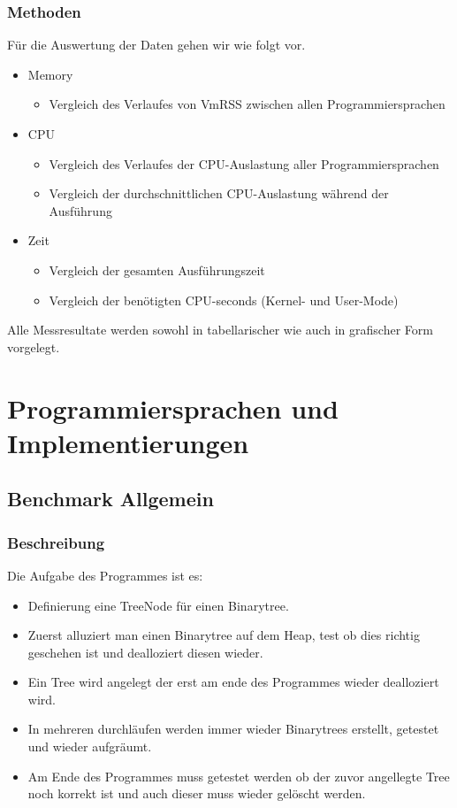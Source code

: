 \documentclass{fancydocument}
\begin{document}
\subsubsection{Methoden}
Für die Auswertung der Daten gehen wir wie folgt vor.
\begin{itemize}
\item Memory
\begin{itemize}
\item Vergleich des Verlaufes von VmRSS zwischen allen Programmiersprachen
\end{itemize}
\item CPU
\begin{itemize}
\item Vergleich des Verlaufes der CPU-Auslastung aller Programmiersprachen
\item Vergleich der durchschnittlichen CPU-Auslastung während der Ausführung
\end{itemize}
\item Zeit
\begin{itemize}
\item Vergleich der gesamten Ausführungszeit
\item Vergleich der benötigten CPU-seconds (Kernel- und User-Mode)
\end{itemize}
\end{itemize}
Alle Messresultate werden sowohl in tabellarischer wie auch in grafischer Form vorgelegt.
\section{Programmiersprachen und Implementierungen}

\subsection{Benchmark Allgemein}

\subsubsection{Beschreibung}

Die Aufgabe des Programmes ist es:
\begin{itemize}
\item Definierung eine TreeNode f\"ur einen Binarytree.
\item Zuerst alluziert man einen Binarytree auf dem Heap, test ob dies
  richtig geschehen ist und dealloziert diesen wieder.
\item Ein Tree wird angelegt der erst am ende des Programmes
  wieder dealloziert wird.
\item In mehreren durchläufen werden immer wieder Binarytrees
  erstellt, getestet und wieder aufgr\"aumt.
\item Am Ende des Programmes muss getestet werden ob der zuvor
  angellegte Tree noch korrekt ist und auch dieser muss wieder
  gel\"oscht werden.
\end{itemize}
\end{document}
